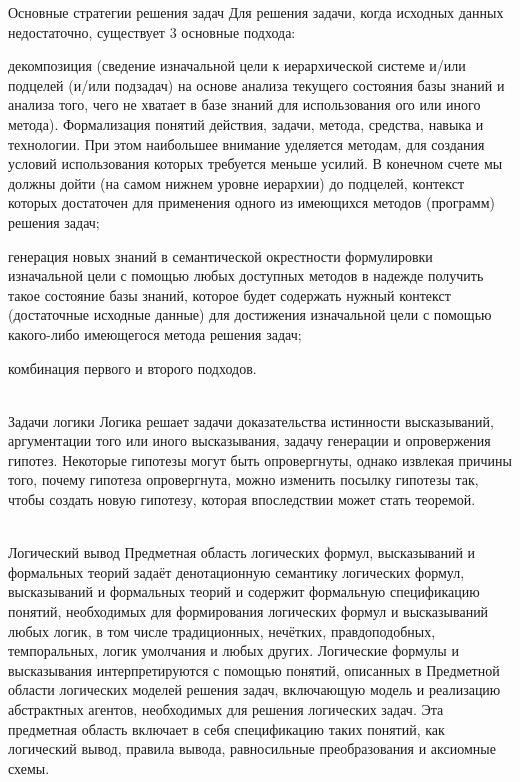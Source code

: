 \begin{frame}{\large Основные стратегии решения задач}
\vspace{20}
        Для решения задачи, когда исходных данных недостаточно, существует 3 основные подхода:
        \begin{textitemize}
            \item декомпозиция (сведение изначальной цели к иерархической системе и/или подцелей (и/или подзадач) на основе анализа текущего состояния базы знаний и анализа того, чего не хватает в базе знаний для использования ого или иного метода). Формализация понятий действия, задачи, метода, средства, навыка и технологии. При этом наибольшее внимание уделяется методам, для создания условий использования которых требуется меньше усилий. В конечном счете мы должны дойти (на самом нижнем уровне иерархии) до подцелей, контекст которых достаточен для применения одного из имеющихся методов (программ) решения задач;
            \item генерация новых знаний в семантической окрестности формулировки изначальной цели с помощью любых доступных методов в надежде получить такое состояние базы знаний, которое будет содержать нужный контекст (достаточные исходные данные) для достижения изначальной цели с помощью какого-либо имеющегося метода решения задач;
            \item комбинация первого и второго подходов.
        \end{textitemize}
\end{frame}

\begin{frame}{\\Задачи логики}
        Логика решает задачи доказательства истинности высказываний, аргументации того или иного высказывания, задачу генерации и опровержения гипотез. Некоторые гипотезы могут быть опровергнуты, однако извлекая причины того, почему гипотеза опровергнута, можно изменить посылку гипотезы так, чтобы создать новую гипотезу, которая впоследствии может стать теоремой.
\end{frame}

\begin{frame}{\\Логический вывод}
    \vspace{10mm}
        Предметная область логических формул, высказываний и формальных теорий задаёт денотационную семантику логических формул, высказываний и формальных теорий и содержит формальную спецификацию понятий, необходимых для формирования логических формул и высказываний любых логик, в том числе традиционных, нечётких, правдоподобных, темпоральных, логик умолчания и любых других. Логические формулы и высказывания интерпретируются с помощью понятий, описанных в Предметной области логических моделей решения задач, включающую модель и реализацию абстрактных агентов, необходимых для решения логических задач. Эта предметная область включает в себя спецификацию таких понятий, как логический вывод, правила вывода, равносильные преобразования и аксиомные схемы.
\end{frame}

